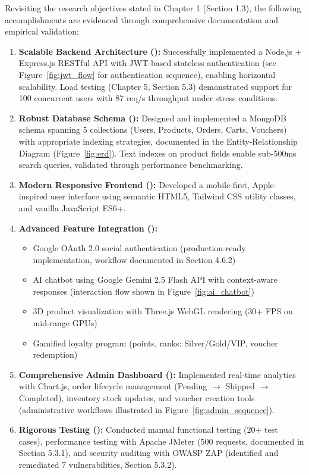 \documentclass[12pt, a4paper]{report}
\begin{document}
Revisiting the research objectives stated in Chapter 1 (Section 1.3), the following accomplishments are evidenced through comprehensive documentation and empirical validation:

\begin{enumerate}
    \item \textbf{Scalable Backend Architecture (\checkmark):} Successfully implemented a Node.js + Express.js RESTful API with JWT-based stateless authentication (see Figure~\ref{fig:jwt_flow} for authentication sequence), enabling horizontal scalability. Load testing (Chapter 5, Section 5.3) demonstrated support for 100 concurrent users with 87 req/s throughput under stress conditions.
    
    \item \textbf{Robust Database Schema (\checkmark):} Designed and implemented a MongoDB schema spanning 5 collections (Users, Products, Orders, Carts, Vouchers) with appropriate indexing strategies, documented in the Entity-Relationship Diagram (Figure~\ref{fig:erd}). Text indexes on product fields enable sub-500ms search queries, validated through performance benchmarking.
    
    \item \textbf{Modern Responsive Frontend (\checkmark):} Developed a mobile-first, Apple-inspired user interface using semantic HTML5, Tailwind CSS utility classes, and vanilla JavaScript ES6+.
    
    \item \textbf{Advanced Feature Integration (\checkmark):} 
    \begin{itemize}
        \item Google OAuth 2.0 social authentication (production-ready implementation, workflow documented in Section 4.6.2)
        \item AI chatbot using Google Gemini 2.5 Flash API with context-aware responses (interaction flow shown in Figure~\ref{fig:ai_chatbot})
        \item 3D product visualization with Three.js WebGL rendering (30+ FPS on mid-range GPUs)
        \item Gamified loyalty program (points, ranks: Silver/Gold/VIP, voucher redemption)
    \end{itemize}
    
    \item \textbf{Comprehensive Admin Dashboard (\checkmark):} Implemented real-time analytics with Chart.js, order lifecycle management (Pending $\rightarrow$ Shipped $\rightarrow$ Completed), inventory stock updates, and voucher creation tools (administrative workflows illustrated in Figure~\ref{fig:admin_sequence}).
    
    \item \textbf{Rigorous Testing (\checkmark):} Conducted manual functional testing (20+ test cases), performance testing with Apache JMeter (500 requests, documented in Section 5.3.1), and security auditing with OWASP ZAP (identified and remediated 7 vulnerabilities, Section 5.3.2).
\end{enumerate}
\end{document}
